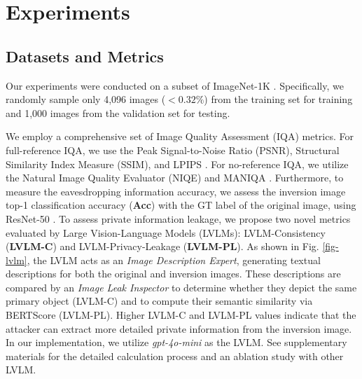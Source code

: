 \section{Experiments}
\subsection{Datasets and Metrics}
Our experiments were conducted on a subset of ImageNet-1K \cite{deng2009imagenet}. Specifically, we randomly sample only 4,096 images ($<0.32 \%$) from the training set for training and 1,000 images from the validation set for testing.

We employ a comprehensive set of Image Quality Assessment (IQA) metrics. For full-reference IQA, we use the Peak Signal-to-Noise Ratio (PSNR), Structural Similarity Index Measure (SSIM), and LPIPS \cite{zhang2018unreasonable}. 
For no-reference IQA, we utilize the Natural Image Quality Evaluator (NIQE) \cite{mittal2012making} and MANIQA \cite{yang2022maniqa}. 
Furthermore, to measure the eavesdropping information accuracy, we assess the inversion image top-1 classification accuracy (\textbf{Acc}) with the GT label of the original image, using ResNet-50 \cite{he2016deep}.
To assess private information leakage, we propose two novel metrics evaluated by Large Vision-Language Models (LVLMs): LVLM-Consistency (\textbf{LVLM-C}) and LVLM-Privacy-Leakage (\textbf{LVLM-PL}).
As shown in Fig. \ref{fig-lvlm}, the LVLM acts as an \textit{Image Description Expert}, generating textual descriptions for both the original and inversion images.
These descriptions are compared by an \textit{Image Leak Inspector} to determine whether they depict the same primary object (LVLM-C) and to compute their semantic similarity via BERTScore \cite{zhang2019bertscore} (LVLM-PL).
Higher LVLM-C and LVLM-PL values indicate that the attacker can extract more detailed private information from the inversion image.
In our implementation, we utilize \textit{gpt-4o-mini} as the LVLM. 
See supplementary materials for the detailed calculation process and an ablation study with other LVLM.
